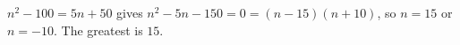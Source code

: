 $n^2-100=5n+50$ gives $n^2-5n-150=0=(n-15)(n+10)$, so $n=15$ or $n=-10$. The greatest is $\boxed{15}$.
